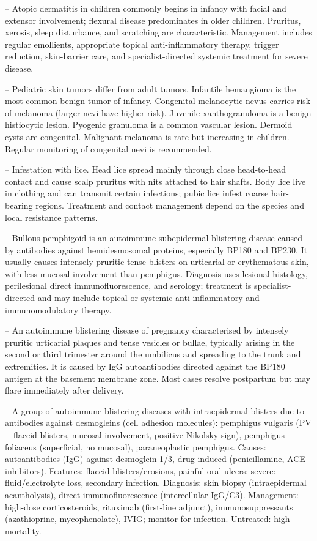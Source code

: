 -- Atopic dermatitis in children commonly begins in infancy with facial and extensor involvement; flexural disease predominates in older children. Pruritus, xerosis, sleep disturbance, and scratching are characteristic. Management includes regular emollients, appropriate topical anti-inflammatory therapy, trigger reduction, skin-barrier care, and specialist-directed systemic treatment for severe disease.

-- Pediatric skin tumors differ from adult tumors. Infantile hemangioma is the most common benign tumor of infancy. Congenital melanocytic nevus carries risk of melanoma (larger nevi have higher risk). Juvenile xanthogranuloma is a benign histiocytic lesion. Pyogenic granuloma is a common vascular lesion. Dermoid cysts are congenital. Malignant melanoma is rare but increasing in children. Regular monitoring of congenital nevi is recommended.

-- Infestation with lice. Head lice spread mainly through close head-to-head contact and cause scalp pruritus with nits attached to hair shafts. Body lice live in clothing and can transmit certain infections; pubic lice infest coarse hair-bearing regions. Treatment and contact management depend on the species and local resistance patterns.

-- Bullous pemphigoid is an autoimmune subepidermal blistering disease caused by antibodies against hemidesmosomal proteins, especially BP180 and BP230. It usually causes intensely pruritic tense blisters on urticarial or erythematous skin, with less mucosal involvement than pemphigus. Diagnosis uses lesional histology, perilesional direct immunofluorescence, and serology; treatment is specialist-directed and may include topical or systemic anti-inflammatory and immunomodulatory therapy.

-- An autoimmune blistering disease of pregnancy characterised by intensely pruritic urticarial plaques and tense vesicles or bullae, typically arising in the second or third trimester around the umbilicus and spreading to the trunk and extremities. It is caused by IgG autoantibodies directed against the BP180 antigen at the basement membrane zone. Most cases resolve postpartum but may flare immediately after delivery.

-- A group of autoimmune blistering diseases with intraepidermal blisters due to antibodies against desmogleins (cell adhesion molecules): pemphigus vulgaris (PV—flaccid blisters, mucosal involvement, positive Nikolsky sign), pemphigus foliaceus (superficial, no mucosal), paraneoplastic pemphigus. Causes: autoantibodies (IgG) against desmoglein 1/3, drug-induced (penicillamine, ACE inhibitors). Features: flaccid blisters/erosions, painful oral ulcers; severe: fluid/electrolyte loss, secondary infection. Diagnosis: skin biopsy (intraepidermal acantholysis), direct immunofluorescence (intercellular IgG/C3). Management: high-dose corticosteroids, rituximab (first-line adjunct), immunosuppressants (azathioprine, mycophenolate), IVIG; monitor for infection. Untreated: high mortality.

